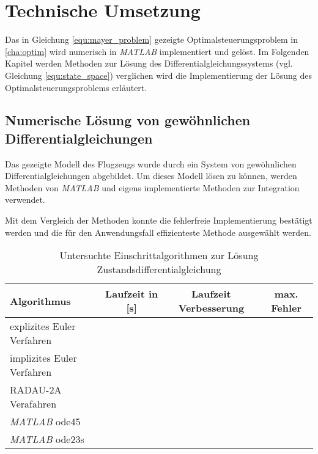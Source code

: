 \chapter{Technische Umsetzung}
Das in Gleichung \eqref{equ:mayer_problem} gezeigte Optimalsteuerungsproblem in \autoref{cha:optim} wird numerisch in \textit{MATLAB} implementiert und gelöst. Im Folgenden Kapitel werden Methoden zur Lösung des Differentialgleichungssystems (vgl. Gleichung \eqref{equ:state_space}) verglichen wird die Implementierung der Lösung des Optimalsteuerungsproblems erläutert.

\section{Numerische Lösung von gewöhnlichen Differentialgleichungen}
Das gezeigte Modell des Flugzeugs wurde durch ein System von gewöhnlichen Differentialgleichungen abgebildet. Um dieses Modell lösen zu können, werden Methoden von \textit{MATLAB} und eigens implementierte Methoden zur Integration verwendet.

Mit dem Vergleich der Methoden konnte die fehlerfreie Implementierung bestätigt werden und die für den Anwendungsfall effizienteste Methode 
ausgewählt werden.

\begin{table}[htbp]
    \caption{Untersuchte Einschrittalgorithmen zur Lösung Zustandsdifferentialgleichung}
    \begin{tabularx}{.9\textwidth}{Xccc}
        \toprule
        \textbf{Algorithmus} & \textbf{Laufzeit in [s]} & \textbf{Laufzeit Verbesserung} & \textbf{max. Fehler} \\
        \midrule
        explizites Euler Verfahren &&&\\
        implizites Euler Verfahren &&&\\
        RADAU-2A Verafahren &&&\\
        \textit{MATLAB} ode45 &&&\\
        \textit{MATLAB} ode23s &&&\\
        \bottomrule
    \end{tabularx}
\end{table}

